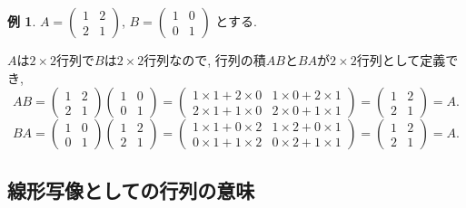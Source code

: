 \documentclass[dvipdfmx,a4paper,11pt]{article}
\theoremstyle{definition}
\newtheorem{exa}[thm]{例}
\begin{document}
  \begin{exa}
  $ A= 
 \begin{pmatrix}
1& 2\\
2 & 1
 \end{pmatrix}
 $, $
 B = 
 \begin{pmatrix}
1 & 0\\
0 & 1
 \end{pmatrix}
 $
 とする. 
 
 $A$は$2\times 2$行列で$B$は$2 \times 2$行列なので, 行列の積$AB$と$BA$が$2 \times 2$行列として定義でき, 
 $$
 AB = 
 \begin{pmatrix}
1& 2\\
2 & 1
 \end{pmatrix}
 \begin{pmatrix}
1 & 0\\
0 & 1
 \end{pmatrix}
 =  
 \begin{pmatrix}
1 \times 1 + 2 \times 0& 1 \times 0 + 2 \times 1\\
2 \times 1 + 1 \times 0 & 2\times 0 + 1 \times 1
 \end{pmatrix}
 = 
 \begin{pmatrix}
1& 2\\
2 & 1
 \end{pmatrix}
 =A.
 $$
  $$
 BA = 
 \begin{pmatrix}
1 & 0\\
0 & 1
 \end{pmatrix}
 \begin{pmatrix}
1& 2\\
2 & 1
 \end{pmatrix}
 =  
 \begin{pmatrix}
1 \times 1 + 0 \times 2& 1 \times 2 + 0 \times 1\\
0 \times 1 + 1 \times 2 & 0\times 2 + 1 \times 1
 \end{pmatrix}
 = 
 \begin{pmatrix}
1& 2\\
2 & 1
 \end{pmatrix}
  =A.
 $$
 
 \end{exa}


 
\subsection{線形写像としての行列の意味 \cite[1.2節]{M}} 
\label{subsec-1.3}
\end{document}
